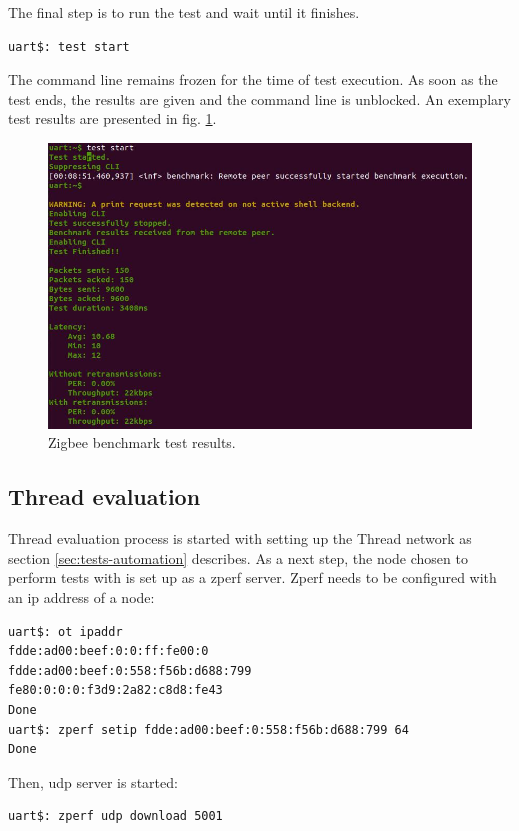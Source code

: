 The final step is to run the test and wait until it finishes.
\begin{lstlisting}
uart$: test start
\end{lstlisting}

The command line remains frozen for the time of test execution. As soon as the test
ends, the results are given and the command line is unblocked. An exemplary test results
are presented in fig. \ref{fig:zigbee_test_results}.
\begin{figure}[H]
    \centering
    \includegraphics[scale=0.7]{images/zigbee-test-result.jpg}
    \caption{Zigbee benchmark test results.}
    \label{fig:zigbee_test_results}
\end{figure}

\subsection{Thread evaluation}

Thread evaluation process is started with setting up the Thread network as
section \ref{sec:tests-automation} describes. As a next step, the node chosen 
to perform tests with is set up as a zperf server. Zperf needs to be configured 
with an ip address of a node:

\begin{lstlisting}[label={lst:setting_zperf}]
uart$: ot ipaddr
fdde:ad00:beef:0:0:ff:fe00:0
fdde:ad00:beef:0:558:f56b:d688:799
fe80:0:0:0:f3d9:2a82:c8d8:fe43
Done
uart$: zperf setip fdde:ad00:beef:0:558:f56b:d688:799 64
Done
\end{lstlisting}

Then, udp server is started:

\begin{lstlisting}
uart$: zperf udp download 5001 
\end{lstlisting}

